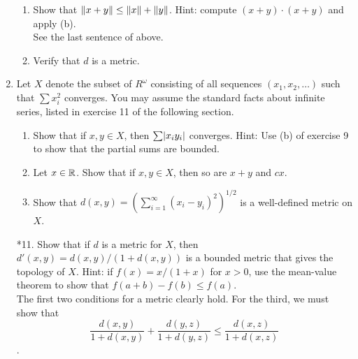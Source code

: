 \documentclass[12pt,letterpaper]{article}
\begin{document}
\begin{enumerate}
\begin{enumerate}
    \item Show that $\lVert x+y\rVert \leq \lVert x\rVert + \lVert y\rVert$. Hint: compute $(x+y)\cdot(x+y)$ and apply (b). \\
    See the last sentence of above.
    \item Verify that $d$ is a metric.
  \end{enumerate}
  \item Let $X$ denote the subset of $R^\omega$ consisting of all sequences $(x_1,x_2,\dots)$ such that $\sum x_i^2$ converges. You may assume the standard facts about infinite series, listed in exercise 11 of the following section. \begin{enumerate}
    \item Show that if $x,y\in X$, then $\sum \lvert x_iy_i\rvert$ converges. Hint: Use (b) of exercise 9 to show that the partial sums are bounded.
    \item Let $x\in \mathbb{R}$. Show that if $x,y\in X$, then so are $x+y$ and $cx$. \\
    \item Show that $d(x,y) = \left(\displaystyle\sum_{i=1}^\infty(x_i-y_i)^2\right)^{1/2}$ is a well-defined metric on $X$.
  \end{enumerate}
  \item [*11.] Show that if $d$ is a metric for $X$, then $d'(x,y) = d(x,y)/(1+d(x,y))$ is a bounded metric that gives the topology of $X$. Hint: if $f(x) = x/(1+x)$ for $x>0$, use the mean-value theorem to show that $f(a+b)-f(b)\leq f(a)$. \\
  The first two conditions for a metric clearly hold. For the third, we must show that $$\frac{d(x,y)}{1+d(x,y)} + \frac{d(y,z)}{1+d(y,z)} \leq \frac{d(x,z)}{1+d(x,z)}$$.
\end{enumerate}
\end{document}
